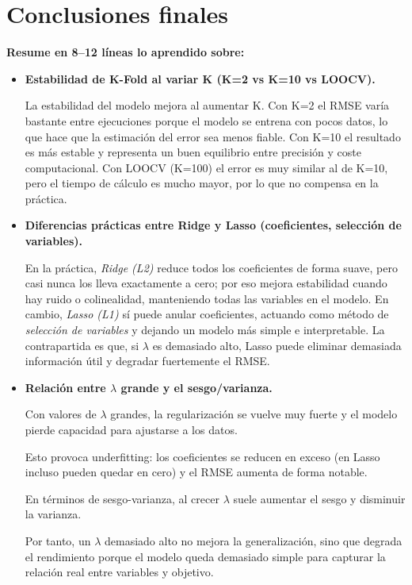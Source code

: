 \documentclass[12pt,oneside]{book}
\begin{document}
\section{Conclusiones finales}
\textbf{Resume en 8--12 líneas lo aprendido sobre:}
\begin{itemize}
    \item \textbf{Estabilidad de K-Fold al variar K (K=2 vs K=10 vs LOOCV).}
    
    La estabilidad del modelo mejora al aumentar K. Con K=2 el RMSE varía bastante entre ejecuciones porque el modelo se entrena con pocos datos, lo que hace que la estimación del error sea menos fiable. Con K=10 el resultado es más estable y representa un buen equilibrio entre precisión y coste computacional. Con LOOCV (K=100) el error es muy similar al de K=10, pero el tiempo de cálculo es mucho mayor, por lo que no compensa en la práctica.
    
    \item \textbf{Diferencias prácticas entre Ridge y Lasso (coeficientes, selección de variables).}

    En la práctica, \textit{Ridge (L2)} reduce todos los coeficientes de forma suave, pero casi nunca los lleva exactamente a cero; por eso mejora estabilidad cuando hay ruido o colinealidad, manteniendo todas las variables en el modelo. En cambio, \textit{Lasso (L1)} sí puede anular coeficientes, actuando como método de \textit{selección de variables} y dejando un modelo más simple e interpretable. La contrapartida es que, si $\lambda$ es demasiado alto, Lasso puede eliminar demasiada información útil y degradar fuertemente el RMSE.
    
    \item \textbf{Relación entre $\lambda$ grande y el sesgo/varianza.}
    
    Con valores de $\lambda$ grandes, la regularización se vuelve muy fuerte y el modelo pierde capacidad para ajustarse a los datos.

    Esto provoca underfitting: los coeficientes se reducen en exceso (en Lasso incluso pueden quedar en cero) y el RMSE aumenta de forma notable.

    En términos de sesgo-varianza, al crecer $\lambda$ suele aumentar el sesgo y disminuir la varianza.

    Por tanto, un $\lambda$ demasiado alto no mejora la generalización, sino que degrada el rendimiento porque el modelo queda demasiado simple para capturar la relación real entre variables y objetivo.


\end{itemize}
\end{document}
